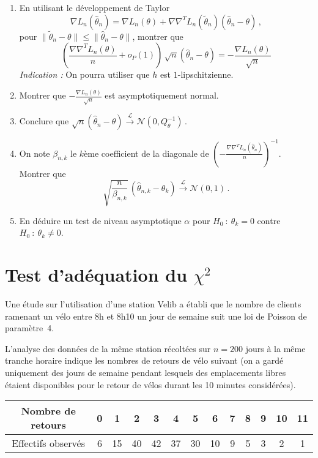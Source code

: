 \documentclass[a4paper,11pt,fleqn]{article}
\newcommand{\1}{\ensuremath{\mathbbm{1}}}
\begin{document}
\begin{enumerate}[resume]
\item En utilisant le d\'eveloppement de Taylor
$$
\nabla L_n(\hat \theta_n)=\nabla L_n(\theta)+ \nabla\nabla^T L_n(\tilde\theta_{n}) (\hat\theta_n-\theta)\,,
$$
pour $\|\tilde\theta_{n}-\theta\|\leq \|\hat\theta_n-\theta\|$, montrer que
$$
 \left(\frac {\nabla\nabla^TL_n(\theta)}{n}+ o_P(1)\right)\, \sqrt n(\hat\theta_n-\theta) = -\frac {\nabla L_n(\theta)}{\sqrt n}
$$
\emph{Indication :} On pourra utiliser que $h$ est $1$-lipschitzienne. 

\item Montrer que $-\frac {\nabla L_n(\theta)}{\sqrt n}$ est asymptotiquement normal.

\item Conclure que $\sqrt n(\hat\theta_n-\theta)\xrightarrow[]{\mathcal L}{\mathcal N}(0,Q_\theta^{-1})$\,.

\item On note $\beta_{n,k}$ le $k${\`e}me coefficient de la diagonale
de $(-\frac {\nabla\nabla^TL_n(\hat\theta_n)}{n})^{-1}$. Montrer que
$$
\sqrt{\frac{n}{\beta_{n,k}}}\,(\hat\theta_{n,k}-\theta_k)\xrightarrow[]{\mathcal L}{\mathcal N}(0,1)\,.
$$
\item En d{\'e}duire un test de niveau asymptotique $\alpha$ pour 
$H_0~:~\theta_k=0$ contre $H_0~:~\theta_k\neq0$.
\end{enumerate}

\section{Test d'ad\'equation du $\chi^2$}
Une \'etude sur l'utilisation d'une station Velib a \'etabli que le nombre de
clients ramenant un v\'elo entre 8h et 8h10 un jour de semaine suit une loi de
Poisson de param\`etre~4.

L'analyse des donn\'ees de la m\^eme station r\'ecolt\'ees sur $n=200$ jours \`a la m\^eme tranche
horaire indique les nombres de retours de v\'elo suivant (on a gard\'e uniquement des jours de semaine pendant lesquels des emplacements
libres \'etaient disponibles pour le retour de v\'elos durant les 10 minutes consid\'er\'ees).
\begin{center}\begin{small}
\begin{tabular}{|c|c|c|c|c|c|c|c|c|c|c|c|c|}
\hline
Nombre de retours&0&1&2&3&4&5&6&7&8&9&10&11\\
\hline
Effectifs observ\'es&6&15&40&42&37&30&10&9&5&3&2&1\\
\hline
\end{tabular}\end{small}
\end{center}
\end{document}
